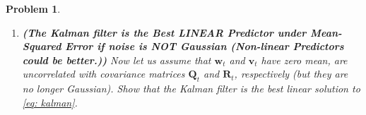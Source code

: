 \documentclass[11pt]{article}
\theoremstyle{plain} %
\newtheorem{problem}[theorem]{Problem}
\newenvironment{solution}
{\color{C2}\normalfont\begin{framed}\begingroup\textbf{Solution:} }
  {\endgroup\end{framed}}
\theoremstyle{remark}
\newcommand{\EE}{\mathbb{E}}
\begin{document}
\begin{problem}
\begin{enumerate}[label=(\alph*)]
\begin{solution}
\begin{align*}
            + 2\mathbb{E}\left\{\mathbb{E}\left[\phi(\hat{\mathbf{x}}_t)\left(\EE\left[\mathbf{x}_t\mid \mathbf{Y}_t\right] - \EE\left[\mathbf{x}_t\mid \mathbf{Y}_t\right]\right)\right]\right\}                                      \\
             & =  \mathbb{E}\left[\|\mathbf{L}_t^\top \left(\mathbf{x}_t - \EE\left[\mathbf{x}_t\mid \mathbf{Y}_t\right]\right)\|^2\right]
            + \mathbb{E}\left[\|\mathbf{L}_t^\top\left(\EE\left[\mathbf{x}_t\mid \mathbf{Y}_t\right] - \hat{\mathbf{x}}_t\right)\|^2\right]                                                                                            \\
             & \ge  \mathbb{E}\left[\|\mathbf{L}_t^\top \left(\mathbf{x}_t - \EE\left[\mathbf{x}_t\mid \mathbf{Y}_t\right]\right)\|^2\right]
          \end{align*}
          where the equality can be attained when $\hat{\mathbf{x}}_t = \EE\left[\mathbf{x}_t\mid \mathbf{Y}_t\right]$.

          Therefore, the Kalman filter is the solution to the problem $\min_{\hat{\mathbf{x}}_t} \mathbb{E}\left[\widetilde{\mathbf{x}}_t^\top \mathbf{W}_t \widetilde{\mathbf{x}}_t\right]$.
        \end{solution}
  \item \textbf{(The Kalman filter is the Best LINEAR Predictor under Mean-Squared Error if noise is NOT Gaussian (Non-linear Predictors could be better.))} Now
        let us assume that $\mathbf{w}_t$ and $\mathbf{v}_t$ have zero mean, are
        uncorrelated with covariance matrices $\mathbf{Q}_t$ and $\mathbf{R}_t$,
        respectively (but they are no longer Gaussian). Show that the Kalman filter is
        the best linear solution to \cref{eq: kalman}.


\end{enumerate}
\end{problem}
\end{document}
